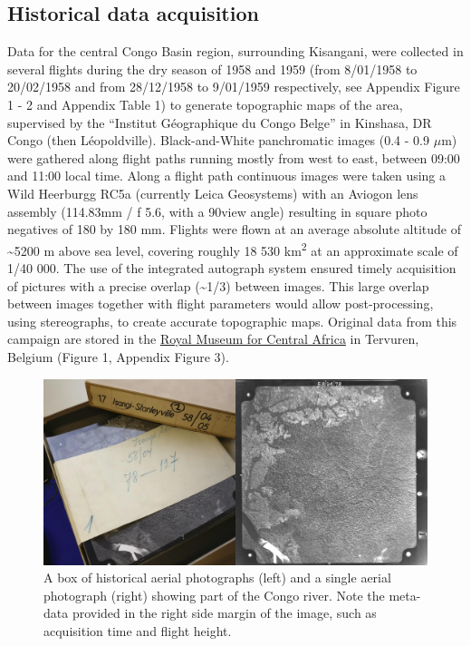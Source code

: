 \documentclass[remote sensing,article,submit,moreauthors,pdftex]{mdpi}
\begin{document}
\hypertarget{historical-data-acquisition}{%
\subsection{Historical data
acquisition}\label{historical-data-acquisition}}

Data for the central Congo Basin region, surrounding Kisangani, were
collected in several flights during the dry season of 1958 and 1959
(from 8/01/1958 to 20/02/1958 and from 28/12/1958 to 9/01/1959
respectively, see Appendix Figure 1 - 2 and Appendix Table 1) to
generate topographic maps of the area, supervised by the ``Institut
Géographique du Congo Belge'' in Kinshasa, DR Congo (then Léopoldville).
Black-and-White panchromatic images (0.4 - 0.9 \(\mu\)m) were gathered
along flight paths running mostly from west to east, between 09:00 and
11:00 local time. Along a flight path continuous images were taken using
a Wild Heerburgg RC5a (currently Leica Geosystems) with an Aviogon lens
assembly (114.83mm / f 5.6, with a 90\degree view angle) resulting in
square photo negatives of 180 by 180 mm. Flights were flown at an
average absolute altitude of \textasciitilde{}5200 m above sea level,
covering roughly 18 530 km\textsuperscript{2} at an approximate scale of
1/40 000. The use of the integrated autograph system ensured timely
acquisition of pictures with a precise overlap (\textasciitilde{}1/3)
between images. This large overlap between images together with flight
parameters would allow post-processing, using stereographs, to create
accurate topographic maps. Original data from this campaign are stored
in the \href{https://www.africamuseum.be/en}{Royal Museum for Central
Africa} in Tervuren, Belgium (Figure 1, Appendix Figure 3).

\begin{figure}

{\centering \includegraphics[width=0.75\linewidth]{./figures/print_examples} 

}

\caption{A box of historical aerial photographs (left) and a single aerial photograph (right) showing part of the Congo river. Note the meta-data provided in the right side margin of the image, such as acquisition time and flight height.}\label{fig:unnamed-chunk-1}
\end{figure}
\end{document}

